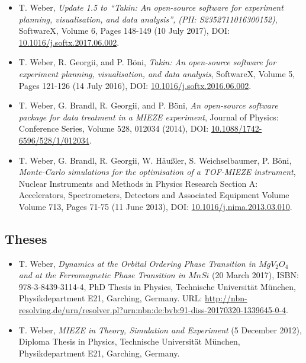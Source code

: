 \begin{itemize}
	\item T. Weber, \textit{Update 1.5 to ``Takin: An open-source software for experiment planning, visualisation, and data analysis'', (PII: S2352711016300152)},
	SoftwareX, Volume 6, Pages 148-149 (10 July 2017),
	DOI: \href{https://doi.org/10.1016/j.softx.2017.06.002}{10.1016/j.softx.2017.06.002}.

	\item T. Weber, R. Georgii, and P. B\"oni,
	\textit{Takin: An open-source software for experiment planning, visualisation, and data analysis},
	SoftwareX, Volume 5, Pages 121-126 (14 July 2016),
	DOI: \href{https://doi.org/10.1016/j.softx.2016.06.002}{10.1016/j.softx.2016.06.002}.

	\item T. Weber, G. Brandl, R. Georgii, and P. B\"oni,
	\textit{An open-source software package for data treatment in a MIEZE experiment},
	Journal of Physics: Conference Series, Volume 528, 012034 (2014),
	DOI: \href{https://doi.org/10.1088/1742-6596/528/1/012034}{10.1088/1742-6596/528/1/012034}.
	
	\item T. Weber, G. Brandl, R. Georgii, W. H\"au\ss{}ler, S. Weichselbaumer, P. B\"oni,
	\textit{Monte-Carlo simulations for the optimisation of a TOF-MIEZE instrument},
	Nuclear Instruments and Methods in Physics Research Section A: Accelerators, Spectrometers, Detectors and Associated Equipment Volume Volume 713, Pages 71-75 (11 June 2013),
	DOI: \href{https://doi.org/10.1016/j.nima.2013.03.010}{10.1016/j.nima.2013.03.010}.
\end{itemize}


\subsection*{Theses}
\begin{itemize}
	\item T. Weber, \textit{Dynamics at the Orbital Ordering Phase Transition in $MgV_2O_4$ and at the Ferromagnetic Phase Transition in $MnSi$} (20 March 2017), ISBN: 978-3-8439-3114-4,
	PhD Thesis in Physics, Technische Universit\"at M\"unchen, Physikdepartment E21,
	Garching, Germany. URL: \url{http://nbn-resolving.de/urn/resolver.pl?urn:nbn:de:bvb:91-diss-20170320-1339645-0-4}.

	\item T. Weber, \textit{MIEZE in Theory, Simulation and Experiment} (5 December 2012), 
	Diploma Thesis in Physics, Technische Universit\"at M\"unchen, Physikdepartment E21,
	Garching, Germany.
\end{itemize}



